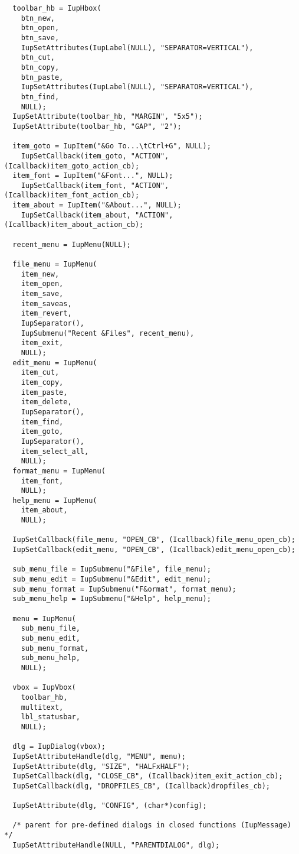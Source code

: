 \documentclass{ctexart}
\begin{document}
\begin{lstlisting}
  toolbar_hb = IupHbox(
    btn_new,
    btn_open,
    btn_save,
    IupSetAttributes(IupLabel(NULL), "SEPARATOR=VERTICAL"),
    btn_cut,
    btn_copy,
    btn_paste,
    IupSetAttributes(IupLabel(NULL), "SEPARATOR=VERTICAL"),
    btn_find,
    NULL);
  IupSetAttribute(toolbar_hb, "MARGIN", "5x5");
  IupSetAttribute(toolbar_hb, "GAP", "2");

  item_goto = IupItem("&Go To...\tCtrl+G", NULL);
    IupSetCallback(item_goto, "ACTION", (Icallback)item_goto_action_cb);
  item_font = IupItem("&Font...", NULL);
    IupSetCallback(item_font, "ACTION", (Icallback)item_font_action_cb);
  item_about = IupItem("&About...", NULL);
    IupSetCallback(item_about, "ACTION", (Icallback)item_about_action_cb);

  recent_menu = IupMenu(NULL);

  file_menu = IupMenu(
    item_new,
    item_open,
    item_save,
    item_saveas,
    item_revert,
    IupSeparator(),
    IupSubmenu("Recent &Files", recent_menu),
    item_exit,
    NULL);
  edit_menu = IupMenu(
    item_cut,
    item_copy,
    item_paste,
    item_delete,
    IupSeparator(),
    item_find,
    item_goto,
    IupSeparator(),
    item_select_all,
    NULL);
  format_menu = IupMenu(
    item_font,
    NULL);
  help_menu = IupMenu(
    item_about,
    NULL);

  IupSetCallback(file_menu, "OPEN_CB", (Icallback)file_menu_open_cb);
  IupSetCallback(edit_menu, "OPEN_CB", (Icallback)edit_menu_open_cb);

  sub_menu_file = IupSubmenu("&File", file_menu);
  sub_menu_edit = IupSubmenu("&Edit", edit_menu);
  sub_menu_format = IupSubmenu("F&ormat", format_menu);
  sub_menu_help = IupSubmenu("&Help", help_menu);

  menu = IupMenu(
    sub_menu_file,
    sub_menu_edit,
    sub_menu_format,
    sub_menu_help,
    NULL);

  vbox = IupVbox(
    toolbar_hb,
    multitext,
    lbl_statusbar,
    NULL);

  dlg = IupDialog(vbox);
  IupSetAttributeHandle(dlg, "MENU", menu);
  IupSetAttribute(dlg, "SIZE", "HALFxHALF");
  IupSetCallback(dlg, "CLOSE_CB", (Icallback)item_exit_action_cb);
  IupSetCallback(dlg, "DROPFILES_CB", (Icallback)dropfiles_cb);

  IupSetAttribute(dlg, "CONFIG", (char*)config);

  /* parent for pre-defined dialogs in closed functions (IupMessage) */
  IupSetAttributeHandle(NULL, "PARENTDIALOG", dlg);


\end{lstlisting}
\end{document}
